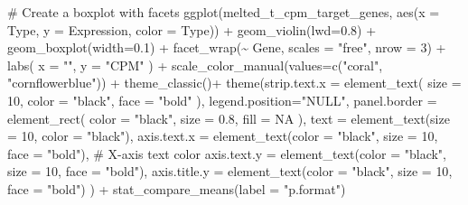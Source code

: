 \documentclass[
  letterpaper,
  DIV=11,
  numbers=noendperiod]{scrreprt}
\newenvironment{Shaded}{\begin{snugshade}}{\end{snugshade}}
\newcommand{\AttributeTok}[1]{\textcolor[rgb]{0.40,0.45,0.13}{#1}}
\newcommand{\CommentTok}[1]{\textcolor[rgb]{0.37,0.37,0.37}{#1}}
\newcommand{\ConstantTok}[1]{\textcolor[rgb]{0.56,0.35,0.01}{#1}}
\newcommand{\DecValTok}[1]{\textcolor[rgb]{0.68,0.00,0.00}{#1}}
\newcommand{\FloatTok}[1]{\textcolor[rgb]{0.68,0.00,0.00}{#1}}
\newcommand{\FunctionTok}[1]{\textcolor[rgb]{0.28,0.35,0.67}{#1}}
\newcommand{\NormalTok}[1]{\textcolor[rgb]{0.00,0.23,0.31}{#1}}
\newcommand{\SpecialCharTok}[1]{\textcolor[rgb]{0.37,0.37,0.37}{#1}}
\newcommand{\StringTok}[1]{\textcolor[rgb]{0.13,0.47,0.30}{#1}}
\begin{document}
\begin{codelisting}
\begin{Shaded}
\begin{Highlighting}[]
\CommentTok{\# Create a boxplot with facets}
\FunctionTok{ggplot}\NormalTok{(melted\_t\_cpm\_target\_genes, }\FunctionTok{aes}\NormalTok{(}\AttributeTok{x =}\NormalTok{ Type, }\AttributeTok{y =}\NormalTok{ Expression, }\AttributeTok{color =}\NormalTok{ Type)) }\SpecialCharTok{+}
  \FunctionTok{geom\_violin}\NormalTok{(}\AttributeTok{lwd=}\FloatTok{0.8}\NormalTok{) }\SpecialCharTok{+}
  \FunctionTok{geom\_boxplot}\NormalTok{(}\AttributeTok{width=}\FloatTok{0.1}\NormalTok{) }\SpecialCharTok{+}
  \FunctionTok{facet\_wrap}\NormalTok{(}\SpecialCharTok{\textasciitilde{}}\NormalTok{ Gene, }\AttributeTok{scales =} \StringTok{"free"}\NormalTok{, }\AttributeTok{nrow =} \DecValTok{3}\NormalTok{) }\SpecialCharTok{+}
  \FunctionTok{labs}\NormalTok{(}
    \AttributeTok{x =} \StringTok{""}\NormalTok{,}
    \AttributeTok{y =} \StringTok{"CPM"}
\NormalTok{  ) }\SpecialCharTok{+} 
  \FunctionTok{scale\_color\_manual}\NormalTok{(}\AttributeTok{values=}\FunctionTok{c}\NormalTok{(}\StringTok{"coral"}\NormalTok{, }\StringTok{"cornflowerblue"}\NormalTok{))  }\SpecialCharTok{+}
  \FunctionTok{theme\_classic}\NormalTok{()}\SpecialCharTok{+}
  \FunctionTok{theme}\NormalTok{(}\AttributeTok{strip.text.x =} \FunctionTok{element\_text}\NormalTok{(}
        \AttributeTok{size =} \DecValTok{10}\NormalTok{, }\AttributeTok{color =} \StringTok{"black"}\NormalTok{, }\AttributeTok{face =} \StringTok{"bold"}
\NormalTok{        ),}
        \AttributeTok{legend.position=}\StringTok{"NULL"}\NormalTok{,}
        \AttributeTok{panel.border =} \FunctionTok{element\_rect}\NormalTok{(}
          \AttributeTok{color =} \StringTok{"black"}\NormalTok{,}
          \AttributeTok{size =} \FloatTok{0.8}\NormalTok{,}
          \AttributeTok{fill =} \ConstantTok{NA}
\NormalTok{          ),}
        \AttributeTok{text =} \FunctionTok{element\_text}\NormalTok{(}\AttributeTok{size =} \DecValTok{10}\NormalTok{, }\AttributeTok{color =} \StringTok{"black"}\NormalTok{),}
        \AttributeTok{axis.text.x =} \FunctionTok{element\_text}\NormalTok{(}\AttributeTok{color =} \StringTok{"black"}\NormalTok{, }\AttributeTok{size =} \DecValTok{10}\NormalTok{, }\AttributeTok{face =} \StringTok{"bold"}\NormalTok{),  }\CommentTok{\# X{-}axis text color}
        \AttributeTok{axis.text.y =} \FunctionTok{element\_text}\NormalTok{(}\AttributeTok{color =} \StringTok{"black"}\NormalTok{, }\AttributeTok{size =} \DecValTok{10}\NormalTok{, }\AttributeTok{face =} \StringTok{"bold"}\NormalTok{),}
        \AttributeTok{axis.title.y =} \FunctionTok{element\_text}\NormalTok{(}\AttributeTok{color =} \StringTok{"black"}\NormalTok{, }\AttributeTok{size =} \DecValTok{10}\NormalTok{, }\AttributeTok{face =} \StringTok{"bold"}\NormalTok{)}
\NormalTok{        ) }\SpecialCharTok{+} \FunctionTok{stat\_compare\_means}\NormalTok{(}\AttributeTok{label =} \StringTok{"p.format"}\NormalTok{)}


\end{Highlighting}
\end{Shaded}
\end{codelisting}
\end{document}
